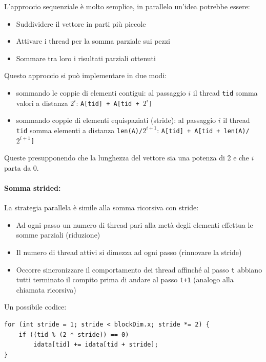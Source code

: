L'approccio sequenziale è molto semplice, in parallelo un'idea potrebbe essere:
\begin{itemize}
	\item Suddividere il vettore in parti più piccole
	
	\item Attivare i thread per la somma parziale sui pezzi 
	
	\item Sommare tra loro i risultati parziali ottenuti
\end{itemize}

Questo approccio si può implementare in due modi:
\begin{itemize}
	\item sommando le coppie di elementi contigui: al passaggio $i$ il thread \texttt{tid} somma valori a distanza $2^i$: \texttt{A[tid] + A[tid + $2^i$]}
	
	\item sommando coppie di elementi equispaziati (stride): al passaggio $i$ il thread \texttt{tid} somma elementi a distanza \texttt{len(A)/$2^{i+1}$}: \texttt{A[tid] + A[tid + len(A)/$2^{i+1}$]}
\end{itemize}

Queste presupponendo che la lunghezza del vettore sia una potenza di 2 e che $i$ parta da 0.

\paragraph{Somma strided:} La strategia parallela è simile alla somma ricorsiva con stride: 
\begin{itemize}
	\item Ad ogni passo un numero di thread pari alla metà degli elementi effettua le somme parziali (riduzione)
	
	\item Il numero di thread attivi si dimezza ad ogni passo (rinnovare la stride)
	
	\item Occorre sincronizzare il comportamento dei thread affinché al passo \texttt{t} abbiano tutti terminato il compito prima di andare al passo \texttt{t+1} (analogo alla chiamata ricorsiva) 
\end{itemize}

Un possibile codice:
\begin{verbatim}
for (int stride = 1; stride < blockDim.x; stride *= 2) {
    if ((tid % (2 * stride)) == 0)
        idata[tid] += idata[tid + stride];
}
\end{verbatim}


